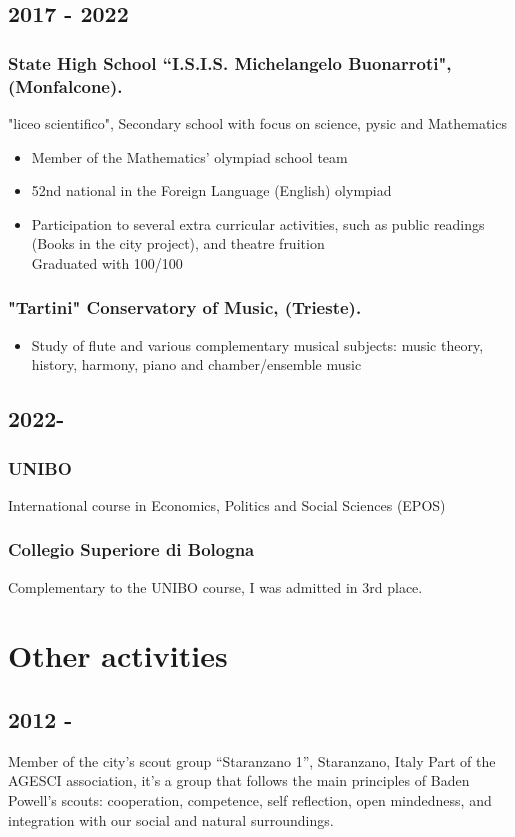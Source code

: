 \documentclass[12pt]{article}
\begin{document}
\subsection{2017 - 2022}
\subsubsection{State High School ``I.S.I.S. Michelangelo Buonarroti", (Monfalcone).}
"liceo scientifico", Secondary school with focus on science, pysic and Mathematics
\begin{itemize}
	\item{Member of the Mathematics' olympiad school team}
	\item{52nd national in the Foreign Language (English) olympiad}
	\item{Participation to several extra curricular activities, such as public readings (Books in the city project), and theatre fruition} \\
Graduated with 100/100
\end{itemize}
\subsubsection{"Tartini" Conservatory of Music, (Trieste).}
\begin{itemize}
	\item{Study of flute and various complementary musical subjects: music theory, history, harmony, piano and chamber/ensemble music}
\end{itemize}
\subsection{2022-}
\subsubsection{UNIBO}
International course in Economics, Politics and Social Sciences (EPOS)
\subsubsection{Collegio Superiore di Bologna} %
Complementary to the UNIBO course, I was admitted in 3rd place.

\section{Other activities}
	\subsection{2012 -}
	Member of the city’s scout group “Staranzano 1”, Staranzano, Italy
Part of the AGESCI association, it's a group that follows the main principles of Baden Powell's scouts: cooperation, competence, self reflection, open mindedness, and integration with our social and natural surroundings.
\end{document}
